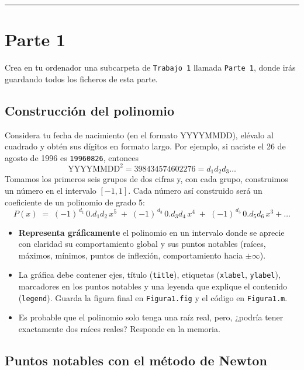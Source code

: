 \documentclass[12pt]{article}
\begin{document}
\vspace{1em}
\hrule
\vspace{1em}

\section*{Parte 1}

Crea en tu ordenador una subcarpeta de \texttt{Trabajo 1} llamada \texttt{Parte 1}, donde irás guardando todos los ficheros de esta parte.

\subsection*{Construcción del polinomio}

Considera tu fecha de nacimiento (en el formato YYYYMMDD), elévalo al cuadrado y obtén sus dígitos en formato largo. Por ejemplo, si naciste el 26 de agosto de 1996 es \texttt{19960826}, entonces
\[
  \mathrm{YYYYMMDD}^2 = 398434574602276 = d_1 d_2 d_3 \dots
\]
Tomamos los primeros seis grupos de dos cifras y, con cada grupo, construimos un número en el intervalo \([-1, 1]\). Cada número así construido será un coeficiente de un polinomio de grado 5:
\[
  P(x) \;=\; ( -1)^{\,d_1}\,0.\!d_1d_2\,x^5
       \;+\; (- 1)^{\,d_3}\,0.\!d_3d_4\,x^4
       \;+\; (- 1)^{\,d_5}\,0.\!d_5d_6\,x^3 + \dots
\]

\begin{itemize}
  \item \textbf{Representa gráficamente} el polinomio en un intervalo donde se aprecie con claridad su comportamiento global y sus puntos notables (raíces, máximos, mínimos, puntos de inflexión, comportamiento hacia $\pm \infty$).  
  \item La gráfica debe contener ejes, título (\texttt{title}), etiquetas (\texttt{xlabel}, \texttt{ylabel}), marcadores en los puntos notables y una leyenda que explique el contenido (\texttt{legend}). Guarda la figura final en \texttt{Figura1.fig} y el código en \texttt{Figura1.m}.
  \item Es probable que el polinomio solo tenga una raíz real, pero, ¿podría tener exactamente dos raíces reales? Responde en la memoria.
\end{itemize}

\subsection*{Puntos notables con el método de Newton}
\end{document}
